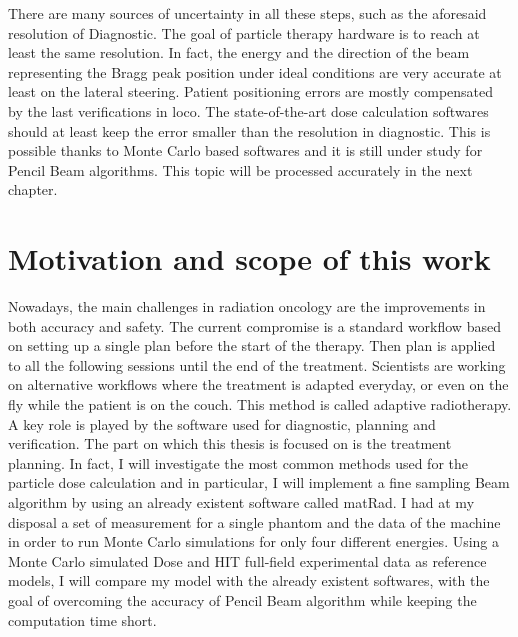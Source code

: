\documentclass[12pt, a4paper, twoside]{book}
\begin{document}
There are many sources of uncertainty in all these steps, such as the aforesaid resolution of Diagnostic. The goal of particle therapy hardware is to reach at least the same resolution. In fact, the energy and the direction of the beam representing the Bragg peak position under ideal conditions are very accurate at least on the lateral steering.
Patient positioning errors are mostly compensated by the last verifications in loco.
The state-of-the-art dose calculation softwares should at least keep the error smaller than the resolution in diagnostic. This is possible thanks to Monte Carlo based softwares and it is still under study for Pencil Beam algorithms. This topic will be processed accurately in the next chapter.



\section{Motivation and scope of this work} 
Nowadays, the main challenges in radiation oncology are the improvements in both accuracy and safety. 
The current compromise is a standard workflow based on setting up a single plan before the start of the therapy. Then plan is applied to all the following sessions until the end of the treatment.
Scientists are working on alternative workflows where the treatment is adapted everyday, or even on the fly while the patient is on the couch. This method is called adaptive radiotherapy.
A key role is played by the software used for diagnostic, planning and verification.
The part on which this thesis is focused on is the treatment planning. In fact, I will investigate the most common methods used for the particle dose calculation and in particular, I will implement a fine sampling Beam algorithm by using an already existent software called matRad. 
I had at my disposal a set of measurement for a single phantom and the data of the machine in order to run Monte Carlo simulations for only four different energies.
Using a Monte Carlo simulated Dose and HIT full-field experimental data as reference models, I will compare my model with the already existent softwares, with the goal of overcoming the accuracy of Pencil Beam algorithm while keeping the computation time short.  
\end{document}
